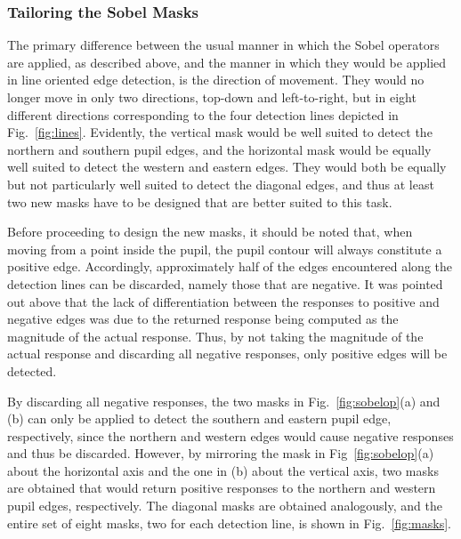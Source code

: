 
\subsubsection{Tailoring the Sobel Masks}

The primary difference between the usual manner in which the Sobel
operators are applied, as described above, and the manner in which
they would be applied in line oriented edge detection, is the
direction of movement.  They would no longer move in only two
directions, top-down and left-to-right, but in eight different
directions corresponding to the four detection lines depicted in
Fig.~\ref{fig:lines}.  Evidently, the vertical mask would be well
suited to detect the northern and southern pupil edges, and the
horizontal mask would be equally well suited to detect the western and
eastern edges.  They would both be equally but not particularly well
suited to detect the diagonal edges, and thus at least two new masks
have to be designed that are better suited to this task.

Before proceeding to design the new masks, it should be noted that,
when moving from a point inside the pupil, the pupil contour will
always constitute a positive edge.  Accordingly, approximately half of
the edges encountered along the detection lines can be discarded,
namely those that are negative.  It was pointed out above that the
lack of differentiation between the responses to positive and negative
edges was due to the returned response being computed as the magnitude
of the actual response.  Thus, by not taking the magnitude of the
actual response and discarding all negative responses, only positive
edges will be detected.

By discarding all negative responses, the two masks in
Fig.~\ref{fig:sobelop}(a) and (b) can only be applied to detect the
southern and eastern pupil edge, respectively, since the northern and
western edges would cause negative responses and thus be discarded.
However, by mirroring the mask in Fig~\ref{fig:sobelop}(a) about the
horizontal axis and the one in (b) about the vertical axis, two masks
are obtained that would return positive responses to the northern and
western pupil edges, respectively.  The diagonal masks are obtained
analogously, and the entire set of eight masks, two for each detection
line, is shown in Fig.~\ref{fig:masks}.

